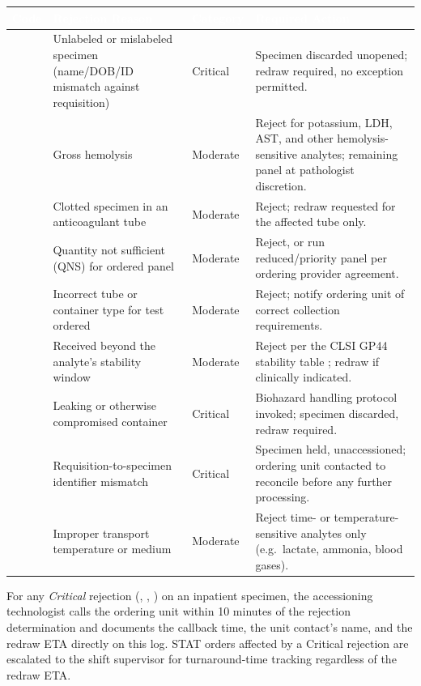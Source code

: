 \vspace{4pt}
\begin{center}
\renewcommand{\arraystretch}{1.25}
\label{tab:codes}
\begin{tabularx}{\linewidth}{@{}C{1.1cm} X C{2.0cm} X@{}}
\textcolor{white}{\bfseries Code} & \textcolor{white}{\bfseries Rejection Reason} &
\textcolor{white}{\bfseries Category} & \textcolor{white}{\bfseries Required Action} \\
\midrule
{} & Unlabeled or mislabeled specimen (name/DOB/ID mismatch against requisition) &
  Critical & Specimen discarded unopened; redraw required, no exception permitted. \\
 & Gross hemolysis &
  Moderate & Reject for potassium, LDH, AST, and other hemolysis-sensitive analytes; remaining panel at pathologist discretion. \\
 & Clotted specimen in an anticoagulant tube &
  Moderate & Reject; redraw requested for the affected tube only. \\
 & Quantity not sufficient (QNS) for ordered panel &
  Moderate & Reject, or run reduced/priority panel per ordering provider agreement. \\
 & Incorrect tube or container type for test ordered &
  Moderate & Reject; notify ordering unit of correct collection requirements. \\
 & Received beyond the analyte's stability window &
  Moderate & Reject per the CLSI GP44 stability table \citep{clsi_gp44}; redraw if clinically indicated. \\
 & Leaking or otherwise compromised container &
  Critical & Biohazard handling protocol invoked; specimen discarded, redraw required. \\
 & Requisition-to-specimen identifier mismatch &
  Critical & Specimen held, unaccessioned; ordering unit contacted to reconcile before any further processing. \\
 & Improper transport temperature or medium &
  Moderate & Reject time- or temperature-sensitive analytes only (e.g.\ lactate, ammonia, blood gases). \\
\bottomrule
\end{tabularx}
\end{center}

\vspace{6pt}
\begin{tcolorbox}[warnbox,title={\faExclamationTriangle\ Redraw Escalation}]
For any \emph{Critical} rejection (, , ) on an inpatient
specimen, the accessioning technologist calls the ordering unit within 10 minutes of the
rejection determination and documents the callback time, the unit contact's name, and the
redraw ETA directly on this log. STAT orders affected by a Critical rejection are escalated to
the shift supervisor for turnaround-time tracking regardless of the redraw ETA.
\end{tcolorbox}
